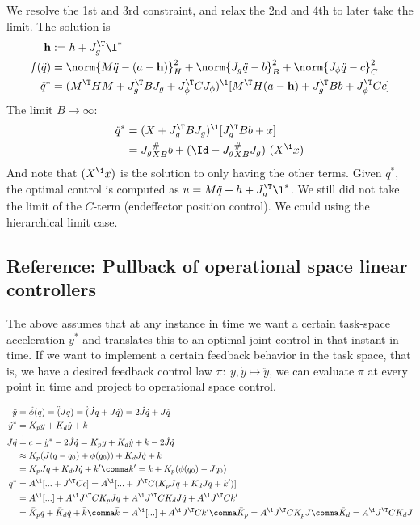 \documentclass[10pt,fleqn,twoside]{article}
\newcommand{\bh}{{\mathbf{h}}}
\begin{document}
{{We resolve the 1st and 3rd constraint, and relax the 2nd and 4th to
later take the limit. The solution is
\begin{align}
\bh
&:= h+J_g^\T\l^*  \\
f(\ddot q)
&=\norm{M\ddot q - (a-\bh)}^2_H
 + \norm{J_g \ddot q - b}^2_B
 + \norm{J_\phi \ddot q - c}^2_C \\
\ddot q^*
&= (M^\T H M + J_g^\T B J_g + J_\phi^\T C J_\phi)^\1 [ M^\T H (a-\bh) + J_g^\T B b + J_\phi^\T C c]
\end{align}
The limit $B\to\infty$:
\begin{align}
\ddot q^*
&= (X + J_g^\T B J_g)^\1 [ J_g^\T B b + x ] \\
&= J_g{}^\#_{XB} b + (\Id - J_g{}^\#_{XB} J_g)~ (X^\1 x)
\end{align}
And note that $(X^\1 x)$ is the solution to only having the other
terms.
Given $\ddot q^*$, the optimal control is computed as $u=M\ddot q + h
+ J_g^\T \l^*$. We still did not take the limit of the $C$-term
(endeffector position control). We could using the hierarchical limit
case.

\subsection{Reference: Pullback of operational space linear controllers}

The above assumes that at any instance in time we want a certain
task-space acceleration $\ddot y^*$ and translates this to an optimal
joint control in that instant in time. If we want to implement a
certain feedback behavior in the task space, that is, we have a
desired feedback control law $\pi:~ y,\dot y \mapsto \ddot y$, we can
evaluate $\pi$ at every point in time and project to operational space
control.

\begin{align}
\ddot y
 &= \ddot \phi(q) = \ddot (J q) = \dot (\dot J q + J \dot q) = 2 \dot J \dot q + J \ddot q \\
\ddot y^*
 &= K_p y + K_d \dot y + k \\
J \ddot q
 &\overset{!}= c = \ddot y^* - 2 \dot J \dot q
  = K_p y + K_d \dot y + k - 2 \dot J \dot q \\
 &\approx K_p (J(q-q_0)+\phi(q_0)) + K_d J \dot q + k \\
 &= K_p J q + K_d J \dot q + k' \comma k' = k + K_p (\phi(q_0)-J q_0) \\
\ddot q^*
 &= A^\1 [... + J^\T C c] = A^\1 [... + J^\T C (K_p J q + K_d J \dot q + k')] \\
 &= A^\1 [...] + A^\1 J^\T C K_p J q + A^\1 J^\T C K_d J \dot q + A^\1 J^\T C k' \\
 &= \bar K_p q + \bar K_d \dot q + \bar k \comma
\bar k =  A^\1 [...] + A^\1 J^\T C k'\comma \bar K_p = A^\1 J^\T C K_p
 J\comma \bar K_d = A^\1 J^\T C K_d J \label{eqProjGains}
\end{align}


}}
\end{document}

